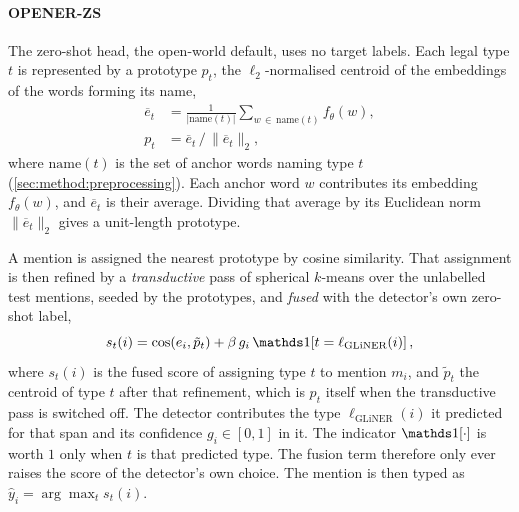 \paragraph{OPENER-ZS} The zero-shot head, the open-world default, uses no target labels. Each legal type $t$ is represented by a prototype $p_t$, the $\ell_2$-normalised centroid of the embeddings of the words forming its name,
\begin{equation}
\begin{split}
\overline{e}_t&=\frac{1}{|\mathrm{name}(t)|}\!\!\sum_{w\,\in\,\mathrm{name}(t)}\!\!f_\theta(w),\\[2pt]
p_t &= \overline{e}_t\,\big/\,\lVert \overline{e}_t\rVert_2,
\end{split}
\end{equation}
where $\mathrm{name}(t)$ is the set of anchor words naming type $t$ (\autoref{sec:method:preprocessing}). Each anchor word $w$ contributes its embedding $f_\theta(w)$, and $\overline{e}_t$ is their average. Dividing that average by its Euclidean norm $\lVert\overline{e}_t\rVert_2$ gives a unit-length prototype. 

A mention is assigned the nearest prototype by cosine similarity. That assignment is then refined by a \emph{transductive} pass of spherical $k$-means over the unlabelled test mentions, seeded by the prototypes, and \emph{fused} with the detector's own zero-shot label,
\begin{equation}
s_t(i)=\cos(e_i,\tilde{p}_t)+\beta\,g_i\,\indic\!\left[t=\ell_{\text{GLiNER}}(i)\right],
\end{equation}
where $s_t(i)$ is the fused score of assigning type $t$ to mention $m_i$, and $\tilde{p}_t$ the centroid of type $t$ after that refinement, which is $p_t$ itself when the transductive pass is switched off. The detector contributes the type $\ell_{\text{GLiNER}}(i)$ it predicted for that span and its confidence $g_i\in[0,1]$ in it. The indicator $\indic[\cdot]$ is worth $1$ only when $t$ is that predicted type. The fusion term therefore only ever raises the score of the detector's own choice. The mention is then typed as $\hat y_i=\arg\max_t s_t(i)$. 

